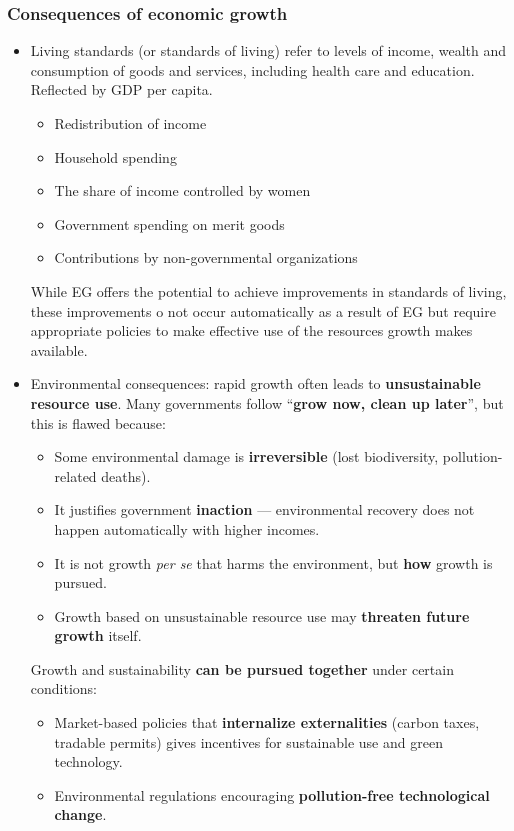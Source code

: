 \subsubsection*{Consequences of economic growth}
\begin{itemize}
  \item Living standards (or standards of living) refer to levels of income, wealth and consumption of goods and services, including health care and education. Reflected by GDP per capita.
  \begin{itemize}
    \item Redistribution of income
    \item Household spending
    \item The share of income controlled by women
    \item Government spending on merit goods
    \item Contributions by non-governmental organizations
  \end{itemize}
  While EG offers the potential to achieve improvements in standards of living, these improvements o not occur automatically as a result of EG but require appropriate policies to make effective use of the resources growth makes available.
  \item Environmental consequences: rapid growth often leads to \textbf{unsustainable resource use}. Many governments follow ``\textbf{grow now, clean up later}'', but this is flawed because:
\begin{itemize}
  \item Some environmental damage is \textbf{irreversible} (lost biodiversity, pollution-related deaths).
  \item It justifies government \textbf{inaction} --- environmental recovery does not happen automatically with higher incomes.
  \item It is not growth \textit{per se} that harms the environment, but \textbf{how} growth is pursued.
  \item Growth based on unsustainable resource use may \textbf{threaten future growth} itself.
\end{itemize}
Growth and sustainability \textbf{can be pursued together} under certain conditions:
\begin{itemize}
  \item Market-based policies that \textbf{internalize externalities} (carbon taxes, tradable permits) gives incentives for sustainable use and green technology.
  \item Environmental regulations encouraging \textbf{pollution-free technological change}.

\end{itemize}
\end{itemize}
